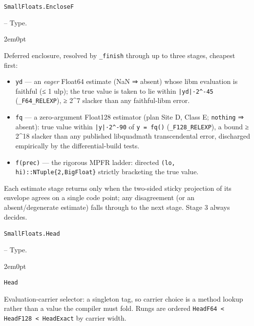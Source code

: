 \par\medskip\noindent\begin{minipage}{\linewidth}
\hypertarget{16356965793446534219}{\texttt{SmallFloats.EncloseF}}  -- {Type.}
\nopagebreak
\begin{adjustwidth}{2em}{0pt}

Deferred enclosure, resolved by \texttt{\_\allowbreak{}finish} through up to three stages, cheapest first:

\begin{itemize}
\item[1. ] \texttt{yd} — an \emph{eager} Float64 estimate (NaN ⇒ absent) whose libm evaluation is faithful (≤ 1 ulp); the true value is taken to lie within \texttt{|yd|·2{\textasciicircum}-45} (\texttt{\_\allowbreak{}F64\_\allowbreak{}RELEXP}), ≥ 2{\textasciicircum}7 slacker than any faithful-libm error.


\item[2. ] \texttt{fq} — a zero-argument Float128 estimator (plan Site D, Class E; \texttt{nothing} ⇒ absent): true value within \texttt{|y|·2{\textasciicircum}-90} of \texttt{y = fq()} (\texttt{\_\allowbreak{}F128\_\allowbreak{}RELEXP}), a bound ≥ 2{\textasciicircum}18 slacker than any published libquadmath transcendental error, discharged empirically by the differential-build tests.


\item[3. ] \texttt{f(prec)} — the rigorous MPFR ladder: directed \texttt{(lo, hi)::NTuple\{2,BigFloat\}} strictly bracketing the true value.

\end{itemize}
Each estimate stage returns only when the two-sided sticky projection of its envelope agrees on a single code point; any disagreement (or an absent/degenerate estimate) falls through to the next stage. Stage 3 always decides.



\end{adjustwidth}
\end{minipage}
\par\medskip

\par\medskip\noindent\begin{minipage}{\linewidth}
\hypertarget{6912697913028347033}{\texttt{SmallFloats.Head}}  -- {Type.}
\nopagebreak
\begin{adjustwidth}{2em}{0pt}


\begin{verbatim}
Head
\end{verbatim}

Evaluation-carrier selector: a singleton tag, so carrier choice is a method lookup rather than a value the compiler must fold. Rungs are ordered \texttt{HeadF64 < HeadF128 < HeadExact} by carrier width.



\end{adjustwidth}
\end{minipage}
\par\medskip

